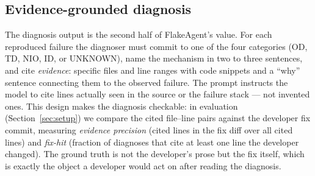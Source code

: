 \subsection{Evidence-grounded diagnosis}

The diagnosis output is the second half of FlakeAgent's value. For each
reproduced failure the diagnoser must commit to one of the four categories
(OD, TD, NIO, ID, or UNKNOWN), name the mechanism in two to three sentences,
and cite \emph{evidence}: specific files and line ranges with code snippets
and a ``why'' sentence connecting them to the observed failure. The prompt
instructs the model to cite lines actually seen in the source or the failure
stack — not invented ones. This design makes the diagnosis checkable: in
evaluation (Section~\ref{sec:setup}) we compare the cited file--line pairs
against the developer fix commit, measuring \emph{evidence precision} (cited
lines in the fix diff over all cited lines) and \emph{fix-hit} (fraction of
diagnoses that cite at least one line the developer changed). The ground
truth is not the developer's prose but the fix itself, which is exactly the
object a developer would act on after reading the diagnosis.
